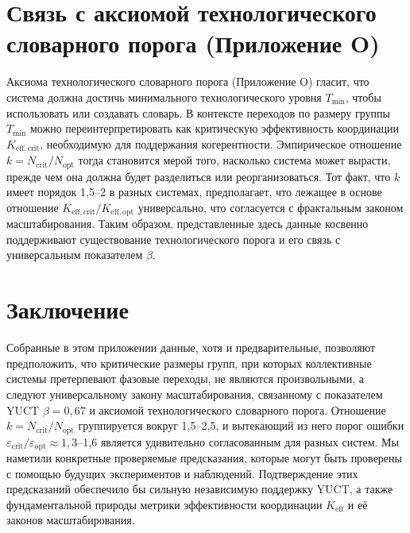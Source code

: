 \documentclass[12pt]{article}
\theoremstyle{remark}
\newcommand{\Keff}{K_{\mathrm{eff}}}
\newcommand{\Tmin}{T_{\min}}
\begin{document}
	\section{Связь с аксиомой технологического словарного порога (Приложение O)}
	\label{sec:connection}
	
	Аксиома технологического словарного порога (Приложение O) гласит, что система должна достичь минимального технологического уровня $\Tmin$, чтобы использовать или создавать словарь. В контексте переходов по размеру группы $\Tmin$ можно переинтерпретировать как критическую эффективность координации $K_{\mathrm{eff},\text{crit}}$, необходимую для поддержания когерентности. Эмпирическое отношение $k = N_{\text{crit}}/N_{\text{opt}}$ тогда становится мерой того, насколько система может вырасти, прежде чем она должна будет разделиться или реорганизоваться. Тот факт, что $k$ имеет порядок 1,5–2 в разных системах, предполагает, что лежащее в основе отношение $K_{\mathrm{eff},\text{crit}}/K_{\mathrm{eff},\text{opt}}$ универсально, что согласуется с фрактальным законом масштабирования. Таким образом, представленные здесь данные косвенно поддерживают существование технологического порога и его связь с универсальным показателем $\beta$.
	
	\section{Заключение}
	\label{sec:conclusion}
	
	Собранные в этом приложении данные, хотя и предварительные, позволяют предположить, что критические размеры групп, при которых коллективные системы претерпевают фазовые переходы, не являются произвольными, а следуют универсальному закону масштабирования, связанному с показателем YUCT $\beta = 0,67$ и аксиомой технологического словарного порога. Отношение $k = N_{\text{crit}}/N_{\text{opt}}$ группируется вокруг 1,5–2,5, и вытекающий из него порог ошибки $\varepsilon_{\text{crit}}/\varepsilon_{\text{opt}} \approx 1,3$–1,6 является удивительно согласованным для разных систем. Мы наметили конкретные проверяемые предсказания, которые могут быть проверены с помощью будущих экспериментов и наблюдений. Подтверждение этих предсказаний обеспечило бы сильную независимую поддержку YUCT, а также фундаментальной природы метрики эффективности координации $\Keff$ и её законов масштабирования.
	
\end{document}
